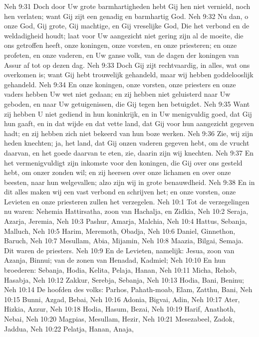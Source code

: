 Neh 9:31  Doch door Uw grote barmhartigheden hebt Gij hen niet vernield, noch hen verlaten; want Gij zijt een genadig en barmhartig God.
Neh 9:32  Nu dan, o onze God, Gij grote, Gij machtige, en Gij vreselijke God, Die het verbond en de weldadigheid houdt; laat voor Uw aangezicht niet gering zijn al de moeite, die ons getroffen heeft, onze koningen, onze vorsten, en onze priesteren; en onze profeten, en onze vaderen, en Uw ganse volk, van de dagen der koningen van Assur af tot op dezen dag.
Neh 9:33  Doch Gij zijt rechtvaardig, in alles, wat ons overkomen is; want Gij hebt trouwelijk gehandeld, maar wij hebben goddelooslijk gehandeld.
Neh 9:34  En onze koningen, onze vorsten, onze priesters en onze vaders hebben Uw wet niet gedaan; en zij hebben niet geluisterd naar Uw geboden, en naar Uw getuigenissen, die Gij tegen hen betuigdet.
Neh 9:35  Want zij hebben U niet gediend in hun koninkrijk, en in Uw menigvuldig goed, dat Gij hun gaaft, en in dat wijde en dat vette land, dat Gij voor hun aangezicht gegeven hadt; en zij hebben zich niet bekeerd van hun boze werken.
Neh 9:36  Zie, wij zijn heden knechten; ja, het land, dat Gij onzen vaderen gegeven hebt, om de vrucht daarvan, en het goede daarvan te eten, zie, daarin zijn wij knechten.
Neh 9:37  En het vermenigvuldigt zijn inkomste voor den koningen, die Gij over ons gesteld hebt, om onzer zonden wil; en zij heersen over onze lichamen en over onze beesten, naar hun welgevallen; alzo zijn wij in grote benauwdheid.
Neh 9:38  En in dit alles maken wij een vast verbond en schrijven het; en onze vorsten, onze Levieten en onze priesteren zullen het verzegelen.
Neh 10:1  Tot de verzegelingen nu waren: Nehemia Hattirsatha, zoon van Hachalja, en Zidkia,
Neh 10:2  Seraja, Azarja, Jeremia,
Neh 10:3  Pashur, Amarja, Malchia,
Neh 10:4  Hattus, Sebanja, Malluch,
Neh 10:5  Harim, Meremoth, Obadja,
Neh 10:6  Daniel, Ginnethon, Baruch,
Neh 10:7  Mesullam, Abia, Mijamin,
Neh 10:8  Maazia, Bilgai, Semaja. Dit waren de priesters.
Neh 10:9  En de Levieten, namelijk: Jesua, zoon van Azanja, Binnui; van de zonen van Henadad, Kadmiel;
Neh 10:10  En hun broederen: Sebanja, Hodia, Kelita, Pelaja, Hanan,
Neh 10:11  Micha, Rehob, Hasabja,
Neh 10:12  Zakkur, Serebja, Sebanja,
Neh 10:13  Hodia, Bani, Beninu;
Neh 10:14  De hoofden des volks: Parhos, Pahath-moab, Elam, Zatthu, Bani,
Neh 10:15  Bunni, Azgad, Bebai,
Neh 10:16  Adonia, Bigvai, Adin,
Neh 10:17  Ater, Hizkia, Azzur,
Neh 10:18  Hodia, Hasum, Bezai,
Neh 10:19  Harif, Anathoth, Nebai,
Neh 10:20  Magpias, Mesullam, Hezir,
Neh 10:21  Mesezabeel, Zadok, Jaddua,
Neh 10:22  Pelatja, Hanan, Anaja,
